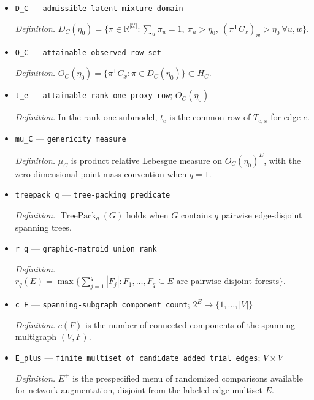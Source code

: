 \documentclass{article}
\begin{document}
\begin{itemize}
  \par\smallskip\noindent\emph{Definition.} \(H_C=\operatorname{aff}\{C_x(u,\cdot):u\in\mathcal U\}\) in a fixed stratum \(x\).
  \item \texttt{D\_\allowbreak{}C} --- \texttt{admissible latent-\allowbreak{}mixture domain}
  \par\smallskip\noindent\emph{Definition.} \(D_C(\eta_0)=\{\pi\in\mathbb R^{|\mathcal U|}:\sum_u\pi_u=1,\ \pi_u>\eta_0,\ (\pi^{\mathsf T}C_x)_w>\eta_0\ \forall u,w\}\).
  \item \texttt{O\_\allowbreak{}C} --- \texttt{attainable observed-\allowbreak{}row set}
  \par\smallskip\noindent\emph{Definition.} \(O_C(\eta_0)=\{\pi^{\mathsf T}C_x:\pi\in D_C(\eta_0)\}\subset H_C\).
  \item \texttt{t\_\allowbreak{}e} --- \texttt{attainable rank-\allowbreak{}one proxy row}; \(O_C(\eta_0)\)
  \par\smallskip\noindent\emph{Definition.} In the rank-one submodel, \(t_e\) is the common row of \(T_{e,x}\) for edge \(e\).
  \item \texttt{mu\_\allowbreak{}C} --- \texttt{genericity measure}
  \par\smallskip\noindent\emph{Definition.} \(\mu_C\) is product relative Lebesgue measure on \(O_C(\eta_0)^E\), with the zero-dimensional point mass convention when \(q=1\).
  \item \texttt{treepack\_\allowbreak{}q} --- \texttt{tree-\allowbreak{}packing predicate}
  \par\smallskip\noindent\emph{Definition.} \(\operatorname{TreePack}_q(G)\) holds when \(G\) contains \(q\) pairwise edge-disjoint spanning trees.
  \item \texttt{r\_\allowbreak{}q} --- \texttt{graphic-\allowbreak{}matroid union rank}
  \par\smallskip\noindent\emph{Definition.} \(r_q(E)=\max\{\sum_{j=1}^{q}|F_j|:F_1,\ldots,F_q\subseteq E\text{ are pairwise disjoint forests}\}\).
  \item \texttt{c\_\allowbreak{}F} --- \texttt{spanning-\allowbreak{}subgraph component count}; \(2^E\to\{1,\ldots,|V|\}\)
  \par\smallskip\noindent\emph{Definition.} \(c(F)\) is the number of connected components of the spanning multigraph \((V,F)\).
  \item \texttt{E\_\allowbreak{}plus} --- \texttt{finite multiset of candidate added trial edges}; \(V\times V\)
  \par\smallskip\noindent\emph{Definition.} \(E^+\) is the prespecified menu of randomized comparisons available for network augmentation, disjoint from the labeled edge multiset \(E\).

\end{itemize}
\end{document}
